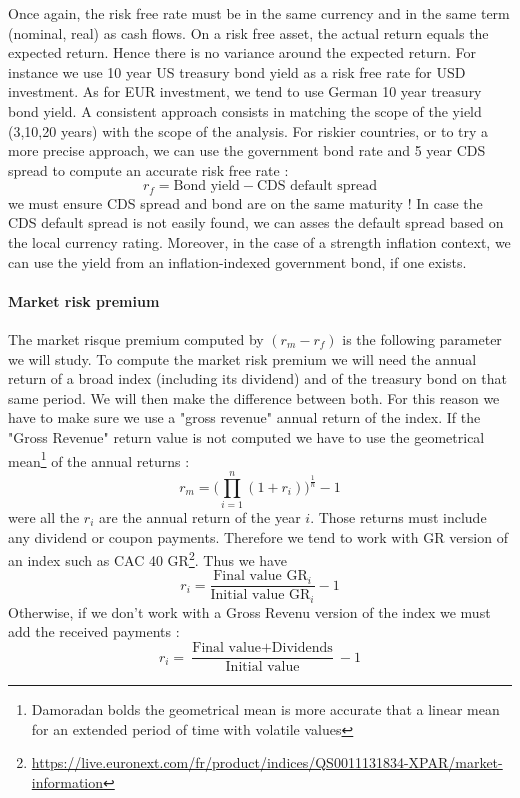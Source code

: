 Once again, the risk free rate must be in the same currency and in the same term (nominal, real) as cash flows. On a risk free asset, the actual return equals the expected return. Hence there is no variance around the expected return. For instance we use 10 year US treasury bond yield as a risk free rate for USD investment. As for EUR investment, we tend to use German 10 year treasury bond yield. A consistent approach consists in matching the scope of the yield (3,10,20 years) with the scope of the analysis. For riskier countries, or to try a more precise approach, we can use the government bond rate and 5 year CDS spread to compute an accurate risk free rate :
\begin{equation}
    r_f = \text{Bond yield} - \text{CDS default spread}
\end{equation}
we must ensure CDS spread and bond are on the same maturity ! In case the CDS default spread is not easily found, we can asses the default spread based on the local currency rating. Moreover, in the case of a strength inflation context, we can use the yield from an inflation-indexed government bond, if one exists.  

\paragraph{Market risk premium}

The market risque premium computed by $(r_m-r_f)$ is the following parameter we will study. To compute the market risk premium we will need the annual  return of a broad index (including its dividend) and of the treasury bond on that same period. We will then make the difference between both. For this reason we have to make sure we use a "gross revenue" annual return of the index. If the "Gross Revenue" return value is not computed we have to use the geometrical mean\footnote{Damoradan bolds the geometrical mean is more accurate that a linear mean for an extended period of time with volatile values} of the annual returns : 
\begin{equation}
    r_m = \bigg( \prod^n_{i=1}(1+r_i)\bigg)^\frac{1}{n}-1
\end{equation}
were all the $r_i$ are the annual return of the year $i$. Those returns must include any dividend or coupon payments. Therefore we tend to work with GR version of an index such as CAC 40 GR\footnote{\href{See more here on Euronext website}{https://live.euronext.com/fr/product/indices/QS0011131834-XPAR/market-information}}. Thus we have
\begin{equation}
    r_i = \frac{\text{Final value GR}_i}{\text{Initial value GR}_i} -1
\end{equation}
Otherwise, if we don't work with a Gross Revenu version of the index we must add the received payments : 
\begin{equation}
    r_i = \frac{\text{Final value} +  \text{Dividends}}{\text{Initial value}} -1
\end{equation}



